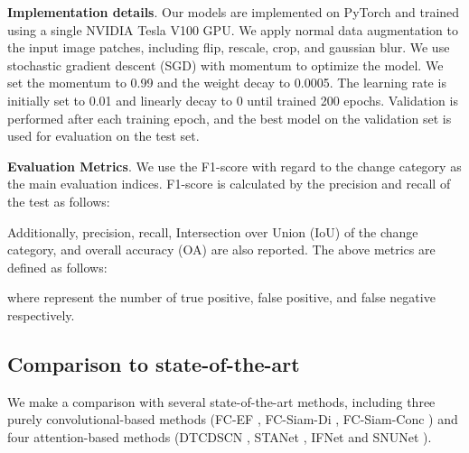 \documentclass[journal]{IEEEtran}
\begin{document}
\textbf{Implementation details}. Our models are implemented on PyTorch and trained using a single NVIDIA Tesla V100 GPU. We apply normal data augmentation to the input image patches, including flip, rescale, crop, and gaussian blur. We use stochastic gradient descent (SGD) with momentum to optimize the model. We set the momentum to 0.99 and the weight decay to 0.0005. The learning rate is initially set to 0.01 and linearly decay to 0 until trained 200 epochs. Validation is performed after each training epoch, and the best model on the validation set is used for evaluation on the test set. 

\textbf{Evaluation Metrics}. We use the F1-score with regard to the change category as the main evaluation indices. F1-score is calculated by the precision and recall of the test as follows:


Additionally, precision, recall, Intersection over Union (IoU) of the change category, and overall accuracy (OA) are also reported. The above metrics are defined as follows: 

where  represent the number of true positive, false positive, and false negative respectively.


\subsection{Comparison to state-of-the-art}
\label{ssec:comparison}

We make a comparison with several state-of-the-art methods, including three purely convolutional-based methods (FC-EF \cite{Daudt2018}, FC-Siam-Di \cite{Daudt2018}, FC-Siam-Conc \cite{Daudt2018}) and 
four attention-based methods (DTCDSCN \cite{Liu2019b}, STANet \cite{Chen2020e}, IFNet \cite{Zhang2020b} and SNUNet \cite{Fang2021}).
\end{document}
